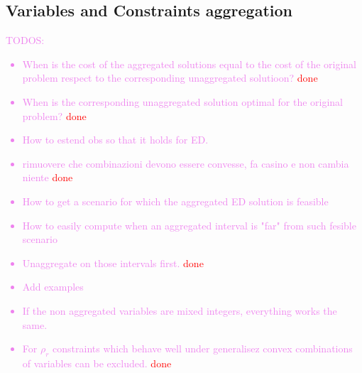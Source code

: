 \subsection{Variables and Constraints aggregation}
\textcolor{violet}{
TODOS:
\begin{itemize}
  \item When is the cost of the aggregated solutions equal to the cost of the original problem respect to the corresponding unaggregated solutioon? \textcolor{red}{done}
  \item When is the corresponding unaggregated solution optimal for the original problem? \textcolor{red}{done}
  \item How to estend obs so that it holds for ED. 
  \item rimuovere che combinazioni devono essere convesse, fa casino e non cambia niente \textcolor{red}{done}
  \item How to get a scenario for which the aggregated ED solution is feasible 
  \item How to easily compute when an aggregated interval is "far" from such fesible scenario
  \item Unaggregate on those intervals first. \textcolor{red}{done}
  \item Add examples
  \item If the non aggregated variables are mixed integers, everything works the same.
  \item For \(\rho_r\) constraints which behave well under generalisez convex combinations of variables can be excluded. \textcolor{red}{done}
\end{itemize}
}


